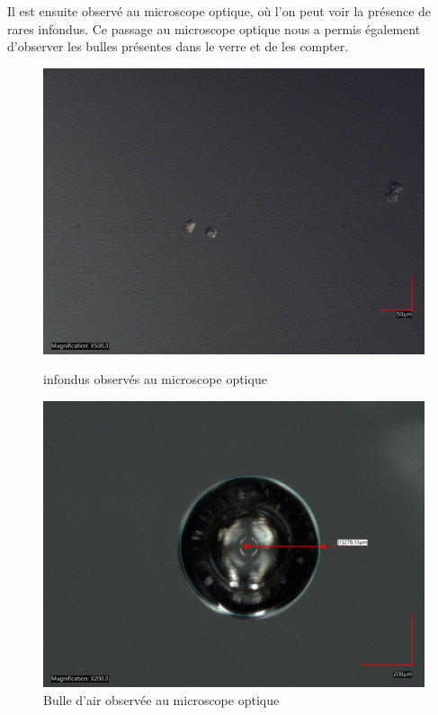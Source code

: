 \documentclass{article}
\begin{document}
Il est ensuite observé au microscope optique, où l'on peut voir la présence de rares infondus. Ce passage au microscope optique nous a permis également d'observer les bulles présentes dans le verre et de les compter.

\begin{figure}[h!]
    \centering
    \begin{minipage}{0.45\textwidth}
        \centering
        \includegraphics[width=\textwidth]{photos/impuetée2.jpg}
        \caption{infondus observés au microscope optique}
    \end{minipage}
    \hspace{0.5cm}
    \begin{minipage}{0.45\textwidth}
        \centering
        \includegraphics[width=\textwidth]{photos/rayon 1.jpg}
        \caption{Bulle d'air observée au microscope optique}
    \end{minipage}
\end{figure}
\end{document}
